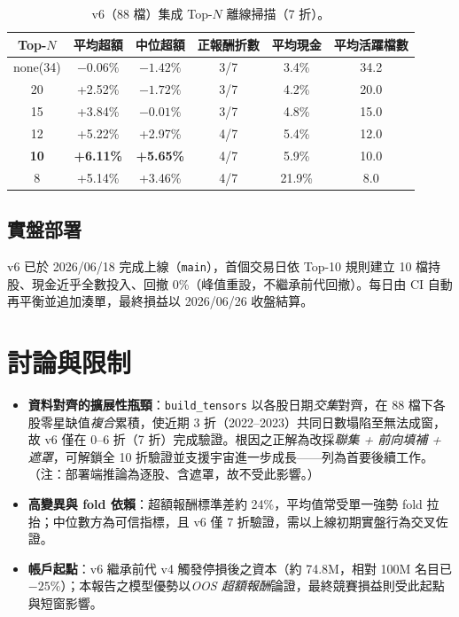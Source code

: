 \documentclass[11pt, fontset=none]{ctexart}
\begin{document}
\begin{table}[h]
  \centering
  \caption{v6（88 檔）集成 Top-$N$ 離線掃描（7 折）。}
  \label{tab:topn}
  \small
  \begin{tabular}{cccccc}
    \toprule
    Top-$N$     & 平均超額             & 中位超額             & 正報酬折數 & 平均現金   & 平均活躍檔數 \\
    \midrule
    none(34)    & $-0.06\%$        & $-1.42\%$        & 3/7   & 3.4\%  & 34.2   \\
    20          & +2.52\%          & $-1.72\%$        & 3/7   & 4.2\%  & 20.0   \\
    15          & +3.84\%          & $-0.01\%$        & 3/7   & 4.8\%  & 15.0   \\
    12          & +5.22\%          & +2.97\%          & 4/7   & 5.4\%  & 12.0   \\
    \textbf{10} & \textbf{+6.11\%} & \textbf{+5.65\%} & 4/7   & 5.9\%  & 10.0   \\
    8           & +5.14\%          & +3.46\%          & 4/7   & 21.9\% & 8.0    \\
    \bottomrule
  \end{tabular}
\end{table}

\subsection{實盤部署}
v6 已於 2026/06/18 完成上線（\texttt{main}），首個交易日依 Top-10 規則建立 10 檔持股、現金近乎全數投入、回撤 0\%（峰值重設，不繼承前代回撤）。每日由 CI 自動再平衡並追加湊單，最終損益以 2026/06/26 收盤結算。

\section{討論與限制}
\begin{itemize}[leftmargin=2em]
  \item \textbf{資料對齊的擴展性瓶頸}：\texttt{build\_tensors} 以各股日期\emph{交集}對齊，在 88 檔下各股零星缺值\emph{複合}累積，使近期 3 折（2022--2023）共同日數塌陷至無法成窗，故 v6 僅在 0--6 折（7 折）完成驗證。根因之正解為改採\emph{聯集 + 前向填補 + 遮罩}，可解鎖全 10 折驗證並支援宇宙進一步成長——列為首要後續工作。（注：部署端推論為逐股、含遮罩，故不受此影響。）
  \item \textbf{高變異與 fold 依賴}：超額報酬標準差約 24\%，平均值常受單一強勢 fold 拉抬；中位數方為可信指標，且 v6 僅 7 折驗證，需以上線初期實盤行為交叉佐證。
  \item \textbf{帳戶起點}：v6 繼承前代 v4 觸發停損後之資本（約 74.8M，相對 100M 名目已 $-25\%$）；本報告之模型優勢以\emph{OOS 超額報酬}論證，最終競賽損益則受此起點與短窗影響。
\end{itemize}
\end{document}
